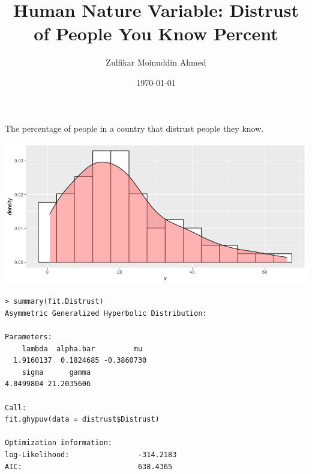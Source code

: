 \documentclass{amsart}
\title{Human Nature Variable:  Distrust of People You Know Percent}
\author{Zulfikar Moinuddin Ahmed}
\date{\today}
\begin{document}
\maketitle

The percentage of people in a country that distrust people they know.

\includegraphics[scale=0.7]{distrust.png}

\begin{verbatim}
> summary(fit.Distrust)
Asymmetric Generalized Hyperbolic Distribution:

Parameters:
    lambda  alpha.bar         mu
  1.9160137  0.1824685 -0.3860730
    sigma      gamma 
4.0499804 21.2035606 

Call:
fit.ghypuv(data = distrust$Distrust)

Optimization information:
log-Likelihood:                -314.2183 
AIC:                           638.4365
\end{verbatim}
\end{document}
